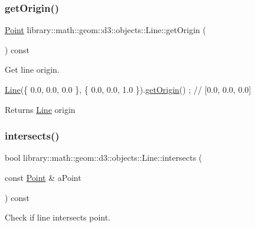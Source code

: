 \subsubsection{\texorpdfstring{get\+Origin()}{getOrigin()}}
{\footnotesize\ttfamily \hyperlink{classlibrary_1_1math_1_1geom_1_1d3_1_1objects_1_1_point}{Point} library\+::math\+::geom\+::d3\+::objects\+::\+Line\+::get\+Origin (\begin{DoxyParamCaption}{ }\end{DoxyParamCaption}) const}



Get line origin. 


\begin{DoxyCode}
\hyperlink{classlibrary_1_1math_1_1geom_1_1d3_1_1objects_1_1_line_a762e529453ff9ffa9233fd73737f4692}{Line}(\{ 0.0, 0.0, 0.0 \}, \{ 0.0, 0.0, 1.0 \}).\hyperlink{classlibrary_1_1math_1_1geom_1_1d3_1_1objects_1_1_line_ad65178573d705ad21bdd54e7f4b7f104}{getOrigin}() ; \textcolor{comment}{// [0.0, 0.0, 0.0]}
\end{DoxyCode}


\begin{DoxyReturn}{Returns}
\hyperlink{classlibrary_1_1math_1_1geom_1_1d3_1_1objects_1_1_line}{Line} origin 
\end{DoxyReturn}
\mbox{\label{classlibrary_1_1math_1_1geom_1_1d3_1_1objects_1_1_line_af40668ee33a6cd265a4b3c3a9a53f294}} 
\subsubsection{\texorpdfstring{intersects()}{intersects()}\hspace{0.1cm}{\footnotesize\ttfamily [1/2]}}
{\footnotesize\ttfamily bool library\+::math\+::geom\+::d3\+::objects\+::\+Line\+::intersects (\begin{DoxyParamCaption}\item[{const \hyperlink{classlibrary_1_1math_1_1geom_1_1d3_1_1objects_1_1_point}{Point} \&}]{a\+Point }\end{DoxyParamCaption}) const}



Check if line intersects point. 


